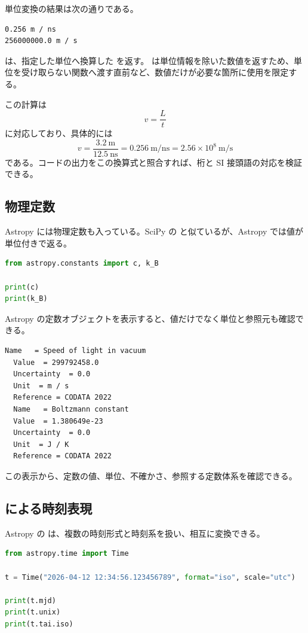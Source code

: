 単位変換の結果は次の通りである。

\begin{lstlisting}[numbers=none, xleftmargin=2\zw]
0.256 m / ns
256000000.0 m / s
\end{lstlisting}

 は、指定した単位へ換算した  を返す。 は単位情報を除いた数値を返すため、単位を受け取らない関数へ渡す直前など、数値だけが必要な箇所に使用を限定する。

この計算は
\[
v = \frac{L}{t}
\]
に対応しており、具体的には
\[
v = \frac{3.2\ \mathrm{m}}{12.5\ \mathrm{ns}}
= 0.256\ \mathrm{m/ns}
= 2.56 \times 10^8\ \mathrm{m/s}
\]
である。コードの出力をこの換算式と照合すれば、桁と SI 接頭語の対応を検証できる。

\subsection{物理定数}

Astropy には物理定数も入っている。SciPy の  と似ているが、Astropy では値が単位付きで返る。

\begin{lstlisting}[language=Python]
from astropy.constants import c, k_B

print(c)
print(k_B)
\end{lstlisting}

Astropy の定数オブジェクトを表示すると、値だけでなく単位と参照元も確認できる。

\begin{lstlisting}[numbers=none, xleftmargin=2\zw]
  Name   = Speed of light in vacuum
  Value  = 299792458.0
  Uncertainty  = 0.0
  Unit  = m / s
  Reference = CODATA 2022
  Name   = Boltzmann constant
  Value  = 1.380649e-23
  Uncertainty  = 0.0
  Unit  = J / K
  Reference = CODATA 2022
\end{lstlisting}

この表示から、定数の値、単位、不確かさ、参照する定数体系を確認できる。

\subsection{ による時刻表現}

Astropy の  は、複数の時刻形式と時刻系を扱い、相互に変換できる。

\begin{lstlisting}[language=Python]
from astropy.time import Time

t = Time("2026-04-12 12:34:56.123456789", format="iso", scale="utc")

print(t.mjd)
print(t.unix)
print(t.tai.iso)
\end{lstlisting}

